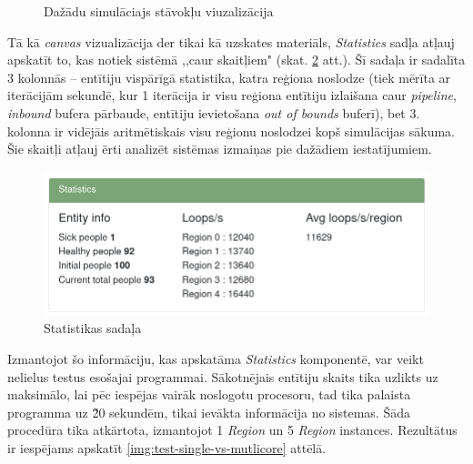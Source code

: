 \begin{figure}[H]
    \caption{Dažādu simulāciajs stāvokļu viuzalizācija}%
    \label{img:canvas-show-off}%
\end{figure}


Tā kā \emph{canvas} vizualizācija der tikai kā uzskates materiāls, \emph{Statistics}
sadļa atļauj apskatīt to, kas notiek sistēmā ,,caur skaitļiem" (skat. \ref{img:statistics} att.).
Šī sadaļa ir sadalīta 3 kolonnās -- entītiju vispārīgā statistika, katra reģiona
noslodze (tiek mērīta ar iterācijām sekundē, kur 1 iterācija ir visu reģiona entītiju
izlaišana caur \emph{pipeline}, \emph{inbound} bufera pārbaude, entītiju ievietošana
\emph{out of bounds} buferī), bet 3. kolonna ir vidējāis aritmētiskais visu reģionu
noslodzei kopš simulācijas sākuma. Šie skaitļi atļauj ērti analizēt sistēmas
izmaiņas pie dažādiem iestatījumiem.

\begin{figure}[H]
	\centering
	\includegraphics[scale=0.5]{images/statistics.png}
	\caption{Statistikas sadaļa}
	\label{img:statistics}
\end{figure}

Izmantojot šo informāciju, kas apskatāma \emph{Statistics} komponentē, var veikt
nelielus testus esošajai programmai. Sākotnējais entītiju skaits tika uzlikts uz
maksimālo, lai pēc iespējas vairāk noslogotu procesoru, tad tika palaista programma
uz \~ 20 sekundēm, tikai ievākta informācija no sistemas. Šāda procedūra tika
atkārtota, izmantojot 1 \emph{Region} un 5 \emph{Region} instances. Rezultātus
ir iespējams apskatīt \ref{img:test-single-vs-mutlicore} attēlā.


